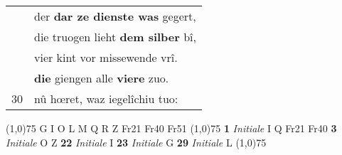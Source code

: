 \documentclass[8pt,a4paper,notitlepage]{article}
\begin{document}
\begin{table}[ht]
\begin{minipage}[t]{0.5\linewidth}
\begin{tabular}{rl}
 & der \textbf{dar ze dienste was} gegert,\\ 
 & die truogen lieht \textbf{dem silber} bî,\\ 
 & vier kint vor missewende vrî.\\ 
 & \textbf{die} giengen alle \textbf{viere} zuo.\\ 
30 & nû hœret, waz iegelîchiu tuo:\\ 
\end{tabular}
\scriptsize
\line(1,0){75} \newline
G I O L M Q R Z Fr21 Fr40 Fr51 \newline
\line(1,0){75} \newline
\textbf{1} \textit{Initiale} I Q Fr21 Fr40  \textbf{3} \textit{Initiale} O Z  \textbf{22} \textit{Initiale} I  \textbf{23} \textit{Initiale} G  \textbf{29} \textit{Initiale} L  \newline
\line(1,0){75} \newline

\end{minipage}
\end{table}
\end{document}
